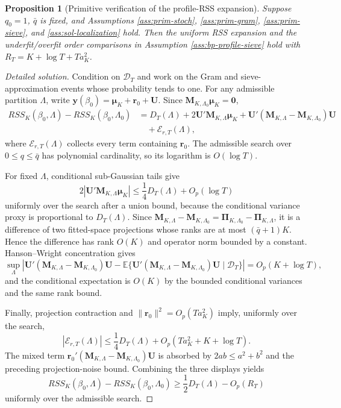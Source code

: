 \documentclass[12pt]{article}
\numberwithin{equation}{section}
\newtheorem{proposition}{Proposition}
\theoremstyle{definition}
\newcommand{\E}{\mathbb E}
\newcommand{\D}{\mathcal D}
\begin{document}
\begin{proposition}[Primitive verification of the profile-RSS expansion]
\label{prop:bp-primitive-expansion}
Suppose \(q_0=1\), \(\bar q\) is fixed, and Assumptions
\ref{ass:prim-stoch}, \ref{ass:prim-gram}, \ref{ass:prim-sieve}, and
\ref{ass:sol-localization} hold.  Then the uniform RSS expansion and the
underfit/overfit order comparisons in Assumption \ref{ass:bp-profile-sieve}
hold with \(R_T=K+\log T+Ta_K^2\).
\end{proposition}

\begin{proof}[Detailed solution]
Condition on \(\D_T\) and work on the Gram and sieve-approximation events whose
probability tends to one.  For any admissible partition \(\Lambda\), write
\(\bm y(\beta_0)=\bm\mu_K+\bm r_0+\bm U\).  Since
\(\bm M_{K,\Lambda_0}\bm\mu_K=\bm0\),
\begin{align*}
    RSS_K(\beta_0,\Lambda)-RSS_K(\beta_0,\Lambda_0)
    &=D_T(\Lambda)+2\bm U'\bm M_{K,\Lambda}\bm\mu_K
      +\bm U'(\bm M_{K,\Lambda}-\bm M_{K,\Lambda_0})\bm U \\
    &\quad+\mathcal E_{r,T}(\Lambda),
\end{align*}
where \(\mathcal E_{r,T}(\Lambda)\) collects every term containing
\(\bm r_0\).  The admissible search over \(0\le q\le\bar q\) has polynomial
cardinality, so its logarithm is \(O(\log T)\).

For fixed \(\Lambda\), conditional sub-Gaussian tails give
\[
    2|\bm U'\bm M_{K,\Lambda}\bm\mu_K|
    \leq \frac14D_T(\Lambda)+O_p(\log T)
\]
uniformly over the search after a union bound, because the conditional variance
proxy is proportional to \(D_T(\Lambda)\).  Since
\(\bm M_{K,\Lambda}-\bm M_{K,\Lambda_0}
=\bm\Pi_{K,\Lambda_0}-\bm\Pi_{K,\Lambda}\), it is a difference of two
fitted-space projections whose ranks are at most \((\bar q+1)K\).  Hence the
difference has rank \(O(K)\) and operator norm bounded by a constant.
Hanson--Wright concentration gives
\[
    \sup_{\Lambda}
    \left|\bm U'(\bm M_{K,\Lambda}-\bm M_{K,\Lambda_0})\bm U
    -\E\{\bm U'(\bm M_{K,\Lambda}-\bm M_{K,\Lambda_0})\bm U\mid\D_T\}\right|
    =O_p(K+\log T),
\]
and the conditional expectation is \(O(K)\) by the bounded conditional variances
and the same rank bound.

Finally, projection contraction and \(\|\bm r_0\|^2=O_p(Ta_K^2)\) imply,
uniformly over the search,
\[
    |\mathcal E_{r,T}(\Lambda)|
    \leq \frac14D_T(\Lambda)+O_p(Ta_K^2+K+\log T).
\]
The mixed term \(\bm r_0'(\bm M_{K,\Lambda}-\bm M_{K,\Lambda_0})\bm U\) is
absorbed by \(2ab\le a^2+b^2\) and the preceding projection-noise bound.
Combining the three displays yields
\[
    RSS_K(\beta_0,\Lambda)-RSS_K(\beta_0,\Lambda_0)
    \geq \frac12D_T(\Lambda)-O_p(R_T)
\]
uniformly over the admissible search.


\end{proof}
\end{document}
